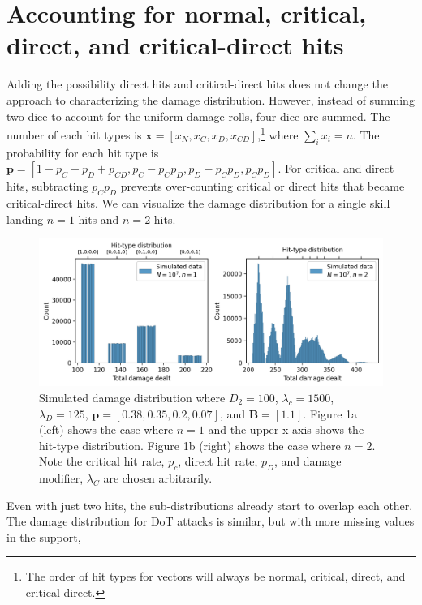 \documentclass{article}
\begin{document}
    \section{Accounting for normal, critical, direct, and critical-direct hits}
        Adding the possibility direct hits and critical-direct hits does not change the approach to characterizing the damage distribution. However, instead of summing two dice to account for the uniform damage rolls, four dice are summed. The number of each hit types is $\textbf{x} = [x_N, x_C, x_D, x_{CD}]$,\footnote{The order of hit types for vectors will always be normal, critical, direct, and critical-direct.} where $\sum_i x_i = n$. The probability for each hit type is $\textbf{p} = [1 - p_C - p_D + p_{CD}, p_C - p_C p_D, p_D  - p_C p_D, p_C p_D]$. For critical and direct hits, subtracting $p_C p_D$ prevents over-counting critical or direct hits that became critical-direct hits. We can visualize the damage distribution for a single skill landing $n=1$ hits and $n=2$ hits.

        \begin{figure}[H]
            \centering
            \includegraphics[width=0.90\linewidth]{img/multi-dmg-dist.PNG}
            \caption{Simulated damage distribution where $D_2 = 100$, $\lambda_c = 1500$, $\lambda_D = 125$, $\textbf{p} = [0.38, 0.35, 0.2 , 0.07]$, and $\textbf{B} = [1.1]$. Figure 1a (left) shows the case where $n=1$ and the upper x-axis shows the hit-type distribution. Figure 1b (right) shows the case where $n=2$. Note the critical hit rate, $p_c$, direct hit rate, $p_D$, and damage modifier, $\lambda_C$ are chosen arbitrarily.}\label{fig:multi-dmg-dist}
        \end{figure}

        Even with just two hits, the sub-distributions already start to overlap each other. The damage distribution for DoT attacks is similar, but with more missing values in the support,
\end{document}
